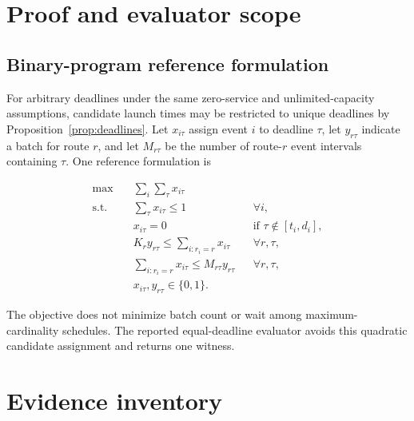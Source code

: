 \section{Proof and evaluator scope}
\label{app:proof-scope}

\subsection{Binary-program reference formulation}

For arbitrary deadlines under the same zero-service and unlimited-capacity
assumptions, candidate launch times may be restricted to unique deadlines by
Proposition~\ref{prop:deadlines}. Let $x_{i\tau}$ assign event $i$ to deadline $\tau$,
let $y_{r\tau}$ indicate a batch for route $r$, and let $M_{r\tau}$ be the
number of route-$r$ event intervals containing $\tau$. One reference
formulation is

\begin{align}
\max\quad &\sum_i\sum_\tau x_{i\tau} \\
\text{s.t.}\quad
&\sum_\tau x_{i\tau}\leq1 &&\forall i,\\
&x_{i\tau}=0 &&\text{if }\tau\notin[t_i,d_i],\\
&K_r y_{r\tau}\leq\sum_{i:r_i=r}x_{i\tau} &&\forall r,\tau,\\
&\sum_{i:r_i=r}x_{i\tau}\leq M_{r\tau}y_{r\tau} &&\forall r,\tau,\\
&x_{i\tau},y_{r\tau}\in\{0,1\}.
\end{align}

The objective does not minimize batch count or wait among
maximum-cardinality schedules. The reported equal-deadline evaluator avoids
this quadratic candidate assignment and returns one witness.

\section{Evidence inventory}
\label{app:evidence}

